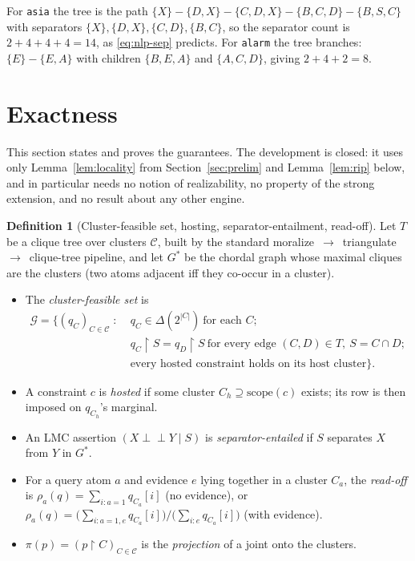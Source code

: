 \documentclass[11pt]{article}
\theoremstyle{definition}
\newtheorem{definition}{Definition}
\newcommand{\indep}{\perp\!\!\!\perp}
\newcommand{\scope}{\mathrm{scope}}
\newcommand{\restr}{\!\restriction\!}
\newcommand{\readoff}{\rho}
\begin{document}
For \texttt{asia} the tree is the path
$\{X\}-\{D,X\}-\{C,D,X\}-\{B,C,D\}-\{B,S,C\}$ with separators
$\{X\},\{D,X\},\{C,D\},\{B,C\}$, so the separator count is
$2+4+4+4=14$, as \eqref{eq:nlp-sep} predicts. For \texttt{alarm} the tree
branches: $\{E\}-\{E,A\}$ with children $\{B,E,A\}$ and $\{A,C,D\}$, giving
$2+4+2=8$.

\section{Exactness}\label{sec:theory}

This section states and proves the guarantees. The development is closed: it uses
only Lemma~\ref{lem:locality} from Section~\ref{sec:prelim} and
Lemma~\ref{lem:rip} below, and in particular needs no notion of realizability, no
property of the strong extension, and no result about any other engine.

\begin{definition}[Cluster-feasible set, hosting, separator-entailment, read-off]\label{def:d5}
Let $T$ be a clique tree over clusters $\mathcal C$, built by the standard
moralize~$\to$~triangulate~$\to$~clique-tree pipeline, and let $G^\ast$ be the
chordal graph whose maximal cliques are the clusters (two atoms adjacent iff they
co-occur in a cluster).
\begin{itemize}
  \item The \emph{cluster-feasible set} is
  \begin{align*}
    \mathcal G=\bigl\{(q_C)_{C\in\mathcal C}\;:\;
      &q_C\in\Delta(2^{|C|})\ \text{for each }C;\\
      &q_C\restr S=q_D\restr S\ \text{for every edge }(C,D)\in T,\ S=C\cap D;\\
      &\text{every hosted constraint holds on its host cluster}\bigr\}.
  \end{align*}
  \item A constraint $c$ is \emph{hosted} if some cluster
    $C_h\supseteq\scope(c)$ exists; its row is then imposed on $q_{C_h}$'s
    marginal.
  \item An LMC assertion $(X\indep Y\mid S)$ is \emph{separator-entailed} if $S$
    separates $X$ from $Y$ in $G^\ast$.
  \item For a query atom $a$ and evidence $e$ lying together in a cluster $C_a$,
    the \emph{read-off} is $\readoff_a(q)=\sum_{i:a=1}q_{C_a}[i]$ (no evidence),
    or $\readoff_a(q)=\bigl(\sum_{i:a=1,e}q_{C_a}[i]\bigr)/
    \bigl(\sum_{i:e}q_{C_a}[i]\bigr)$ (with evidence).
  \item $\pi(p)=(p\restr C)_{C\in\mathcal C}$ is the \emph{projection} of a joint
    onto the clusters.
\end{itemize}
\end{definition}
\end{document}
